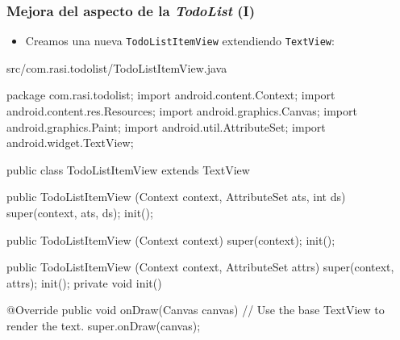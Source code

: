 \documentclass[hyperref={pdfpagelabels=true},ucs]{beamer}
\begin{document}
\begin{frame}[fragile,shrink=10]
\frametitle{Mejora del aspecto de la \emph{TodoList} (I)}

\begin{itemize}
\item Creamos una nueva \verb|TodoListItemView| extendiendo \verb|TextView|:
\end{itemize}

\begin{tiny}
\begin{block}{src/com.rasi.todolist/TodoListItemView.java}
\begin{java}
package com.rasi.todolist;
import android.content.Context;
import android.content.res.Resources;
import android.graphics.Canvas;
import android.graphics.Paint;
import android.util.AttributeSet;
import android.widget.TextView;

public class TodoListItemView extends TextView {
  public TodoListItemView (Context context, AttributeSet ats, int ds) {
    super(context, ats, ds);
    init();
  }

  public TodoListItemView (Context context) {
    super(context);
    init();
  }

  public TodoListItemView (Context context, AttributeSet attrs) {
    super(context, attrs);
    init();
  }
  private void init() {
  }

  @Override
  public void onDraw(Canvas canvas) {
    // Use the base TextView to render the text.
    super.onDraw(canvas);
  }
}
\end{java}
\end{block}
\end{tiny}


\end{frame}
\end{document}
